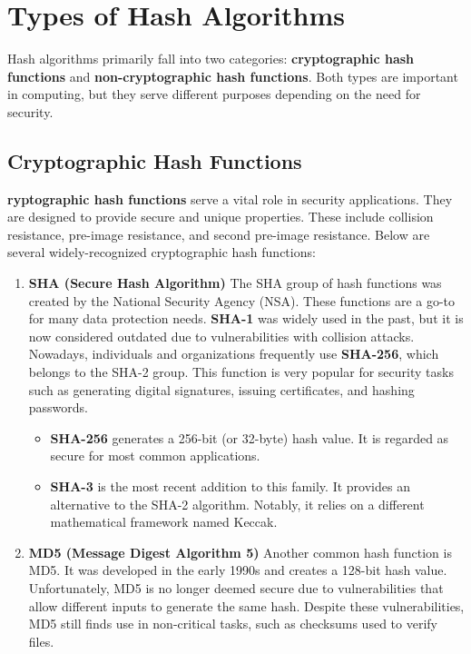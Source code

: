 \documentclass[11pt,a4paper]{article}
\begin{document}
\section*{Types of Hash Algorithms}
Hash algorithms primarily fall into two categories: \textbf{cryptographic hash functions} and \textbf{non-cryptographic hash functions}. Both types are important in computing, but they serve different purposes depending on the need for security.

    \subsection*{Cryptographic Hash Functions}
    \textbf{ryptographic hash functions} serve a vital role in security applications. They are designed to provide secure and unique properties. These include collision resistance, pre-image resistance, and second pre-image resistance. Below are several widely-recognized cryptographic hash functions:~\cite{Cryptographic}
        \begin{enumerate}
            \item \textbf{SHA (Secure Hash Algorithm)}
            \newline
            The SHA group of hash functions was created by the National Security Agency (NSA). These functions are a go-to for many data protection needs. \textbf{SHA-1} was widely used in the past, but it is now considered outdated due to vulnerabilities with collision attacks. Nowadays, individuals and organizations frequently use \textbf{SHA-256}, which belongs to the SHA-2 group. This function is very popular for security tasks such as generating digital signatures, issuing certificates, and hashing passwords.

                \begin{itemize}
                    \item \textbf{SHA-256} generates a 256-bit (or 32-byte) hash value. It is regarded as secure for most common applications.
                    
                    \item \textbf{SHA-3} is the most recent addition to this family. It provides an alternative to the SHA-2 algorithm. Notably, it relies on a different mathematical framework named Keccak.
                \end{itemize}

            \item \textbf{MD5 (Message Digest Algorithm 5)}
            \newline
            Another common hash function is MD5. It was developed in the early 1990s and creates a 128-bit hash value. Unfortunately, MD5 is no longer deemed secure due to vulnerabilities that allow different inputs to generate the same hash. Despite these vulnerabilities, MD5 still finds use in non-critical tasks, such as checksums used to verify files.

        \end{enumerate}
\end{document}
